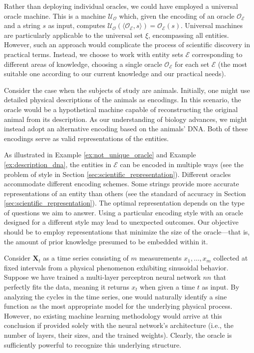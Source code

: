 Rather than deploying individual oracles, we could have employed a universal oracle machine. This is a machine $\mathcal{U}_\mathcal{O}$ which, given the encoding of an oracle $\mathcal{O}_\mathcal{E}$ and a string $s$ as input, computes $\mathcal{U}_\mathcal{O} \left( \langle \mathcal{O}_\mathcal{E}, s \rangle \right) = \mathcal{O}_\mathcal{E} \left( s \right)$. Universal machines are particularly applicable to the universal set $\xi$, encompassing all entities. However, such an approach would complicate the process of scientific discovery in practical terms. Instead, we choose to work with entity sets $\mathcal{E}$ corresponding to different areas of knowledge, choosing a single oracle $\mathcal{O}_\mathcal{E}$ for each set $\mathcal{E}$ (the most suitable one according to our current knowledge and our practical needs).

\begin{example}
\label{ex:description_dna}
Consider the case when the subjects of study are animals. Initially, one might use detailed physical descriptions of the animals as encodings. In this scenario, the oracle would be a hypothetical machine capable of reconstructing the original animal from its description. As our understanding of biology advances, we might instead adopt an alternative encoding based on the animals' DNA. Both of these encodings serve as valid representations of the entities.
\end{example}

As illustrated in Example \ref{ex:not_unique_oracle} and Example \ref{ex:description_dna}, the entities in $\mathcal{E}$ can be encoded in multiple ways (see the problem of style in Section \ref{sec:scientific_representation}). Different oracles accommodate different encoding schemes. Some strings provide more accurate representations of an entity than others (see the standard of accuracy in Section \ref{sec:scientific_representation}). The optimal representation depends on the type of questions we aim to answer. Using a particular encoding style with an oracle designed for a different style may lead to unexpected outcomes. Our objective should be to employ representations that minimize the size of the oracle—that is, the amount of prior knowledge presumed to be embedded within it.

\begin{example}
Consider $\mathbf{X}_t$ as a time series consisting of $m$ measurements $x_1, \ldots, x_m$ collected at fixed intervals from a physical phenomenon exhibiting sinusoidal behavior. Suppose we have trained a multi-layer perceptron neural network $nn$ that perfectly fits the data, meaning it returns $x_t$ when given a time $t$ as input. By analyzing the cycles in the time series, one would naturally identify a sine function as the most appropriate model for the underlying physical process. However, no existing machine learning methodology would arrive at this conclusion if provided solely with the neural network's architecture (i.e., the number of layers, their sizes, and the trained weights). Clearly, the oracle is sufficiently powerful to recognize this underlying structure.
\end{example}

